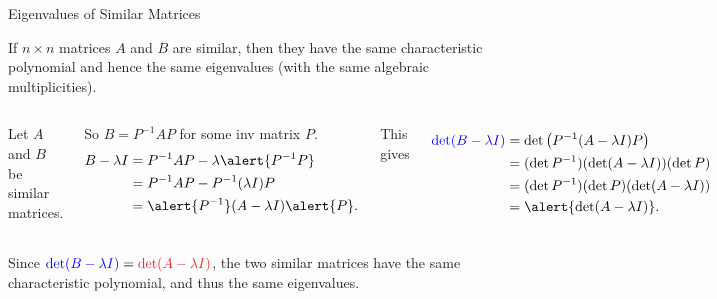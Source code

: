 \documentclass[xcolor=dvipsnames,aspectratio=169,t]{beamer}
\begin{document}
\begin{frame}{Eigenvalues of Similar Matrices}
  \smallskip

  \begin{theorem}
    If $n \times n$ matrices $A$ and $B$ are \alert{similar}, then they have the \alert{same characteristic polynomial} and hence the \alert{same eigenvalues} (with the same algebraic multiplicities).
  \end{theorem}
  \smallskip

  \pause
  \begin{columns}[T]

  \column{0.45\tw}
  Let $A$ and $B$ be similar matrices.
  
  So $B=P^{-1}AP$ for some inv matrix $P$.
  \pause
  \begin{align*} B - \lambda I &= P^{-1}AP - \lambda \alert{P^{-1}P}\\
  &= P^{-1}AP - P^{-1}(\lambda I) P \\
  &= \alert{P^{-1}}(A - \lambda I ) \alert{P} .
  \end{align*}

  \column{0.4\tw}
  \pause
  This gives
  \vspace*{-1.7em}
  
  \begin{align*}
  \blue{\det (B- \lambda I)} &= \det \big( P^{-1}(A - \lambda I ) P \big)\\ 
  &= (\det P^{-1}) (\det (A-\lambda I)) (\det P)\\
  &= (\det P^{-1})(\det P)  (\det (A-\lambda I))\\
  &= \alert{\det (A-\lambda I)}. \end{align*}
  \end{columns}
  \bigskip

  \pause
  Since  $\blue{\det (B- \lambda I)}  = \red{\det (A-\lambda I)}$, the two similar matrices have the same characteristic polynomial, and thus the same eigenvalues.
  \hfill\blue{\qed}
\end{frame}
\end{document}
